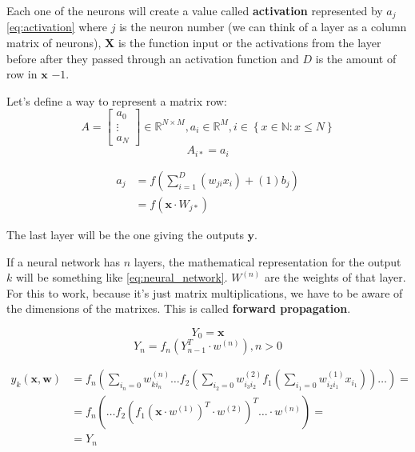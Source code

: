 \documentclass[a4paper,12pt]{article}
\theoremstyle{mytheoremstyle}
\theoremstyle{mytheoremstyle}
\theoremstyle{myproblemstyle}
\begin{document}
    Each one of the neurons will create a value called \textbf{activation}
    represented by $ a_{j} $ \eqref{eq:activation} where $ j $ is the neuron
    number (we can think of a layer as a column matrix of neurons), $
    \mathbf{X} $ is the function input or the activations from the layer before
    after they passed through an activation function and $ D $ is the amount of
    row in $ \mathbf{x} $ $ - 1 $.

    Let's define a way to represent a matrix row:
    $$
        A = \begin{bmatrix}a_{0}\\\vdots\\a_{N}\end{bmatrix} \in \mathbb{R}^{N
            \times M}, a_{i} \in \mathbb{R}^{M}, i \in \left\{ x \in
            \mathbb{N}: x \le N \right\}
    $$
    $$
        A_{i *} = a_{i}
    $$

    \begin{equation}
        \begin{split}
            a_{j} & = f \left( \displaystyle\sum_{i=1}^{D} \left( w_{ji}x_{i}
            \right) + (1)b_{j} \right) \\ & = f \left( \mathbf{x} \cdot W_{j *}
            \right)
        \end{split}
        \label{eq:activation}
    \end{equation}

    The last layer will be the one giving the outputs $ \mathbf{y} $.

    If a neural network has $ n $ layers, the mathematical representation for
    the output $ k $ will be something like \eqref{eq:neural_network}. $
    W^{(n)} $ are the weights of that layer. For this to work, because it's
    just matrix multiplications, we have to be aware of the dimensions of the
    matrixes. This is called \textbf{forward propagation}.

    \begin{equation}
        Y_{0} = \mathbf{x}
    \end{equation}
    \begin{equation}
        Y_{n} = f_{n} \left( Y_{n - 1}^{T} \cdot w^{(n)} \right), n > 0
    \end{equation}

    \begin{equation}
        \begin{split}
            y_{k}(\mathbf{x}, \mathbf{w}) & = f_{n} \left( \displaystyle\sum_{i_{n}=0} w_{k i_{n}}^{(n)} \hdots f_{2} \left( \displaystyle\sum_{i_{2}=0} w_{i_{3}i_{2}}^{(2)} f_{1} \left( \displaystyle\sum_{i_{1}=0} w_{i_{2}i_{1}}^{(1)}x_{i_{1}} \right) \right) \hdots \right) = \\
            & = f_{n} \left( \hdots f_{2} \left( f_{1} \left( \mathbf{x} \cdot w^{(1)} \right)^{T} \cdot w^{(2)} \right)^{T} \hdots \cdot w^{(n)} \right) = \\
            & = Y_{n}
        \end{split}
        \label{eq:neural_network}
    \end{equation}
\end{document}
